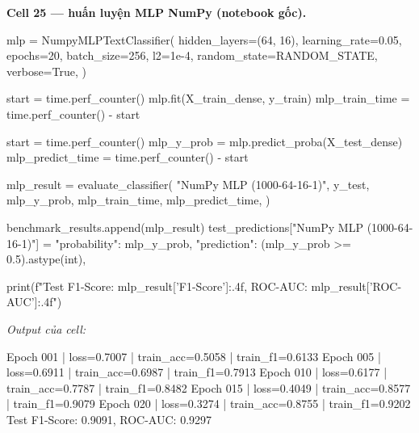 \documentclass[12pt,a4paper]{report}
\begin{document}
\par\medskip\noindent\textbf{Cell 25 --- huấn luyện MLP NumPy (notebook gốc).}
\begin{NotebookCode}
mlp = NumpyMLPTextClassifier(
    hidden_layers=(64, 16),
    learning_rate=0.05,
    epochs=20,
    batch_size=256,
    l2=1e-4,
    random_state=RANDOM_STATE,
    verbose=True,
)

start = time.perf_counter()
mlp.fit(X_train_dense, y_train)
mlp_train_time = time.perf_counter() - start

start = time.perf_counter()
mlp_y_prob = mlp.predict_proba(X_test_dense)
mlp_predict_time = time.perf_counter() - start

mlp_result = evaluate_classifier(
    "NumPy MLP (1000-64-16-1)",
    y_test,
    mlp_y_prob,
    mlp_train_time,
    mlp_predict_time,
)

benchmark_results.append(mlp_result)
test_predictions["NumPy MLP (1000-64-16-1)"] = {
    "probability": mlp_y_prob,
    "prediction": (mlp_y_prob >= 0.5).astype(int),
}

print(f"Test F1-Score: {mlp_result['F1-Score']:.4f}, ROC-AUC: {mlp_result['ROC-AUC']:.4f}")
\end{NotebookCode}
\noindent\textit{Output của cell:}
\begin{NotebookOutput}
Epoch 001 | loss=0.7007 | train_acc=0.5058 | train_f1=0.6133
Epoch 005 | loss=0.6911 | train_acc=0.6987 | train_f1=0.7913
Epoch 010 | loss=0.6177 | train_acc=0.7787 | train_f1=0.8482
Epoch 015 | loss=0.4049 | train_acc=0.8577 | train_f1=0.9079
Epoch 020 | loss=0.3274 | train_acc=0.8755 | train_f1=0.9202
Test F1-Score: 0.9091, ROC-AUC: 0.9297
\end{NotebookOutput}

\begin{table}[htbp]\centering\caption{Ba mô hình được chọn trên customer comments (test set)}\label{tab:comments-results}
\end{table}
\end{document}

